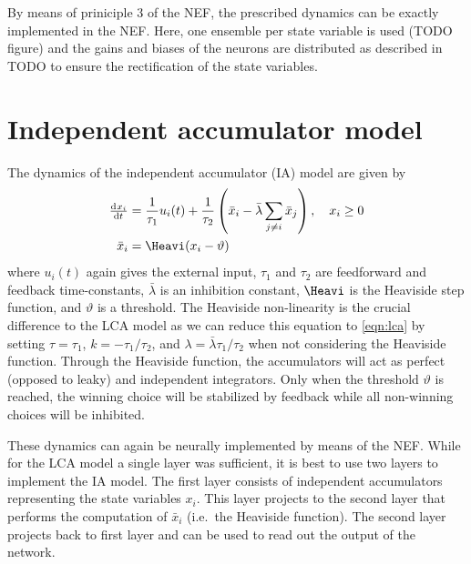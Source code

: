 By means of priniciple 3 of the NEF, the prescribed dynamics can be exactly implemented in the NEF\@.
Here, one ensemble per state variable is used (TODO figure) and the gains and biases of the neurons are distributed as described in TODO to ensure the rectification of the state variables.


\section{Independent accumulator model}
The dynamics of the independent accumulator (IA) model are given by
\begin{align}
    \od{x_i}{t} &= \frac{1}{\tau_1} u_i(t) + \frac{1}{\tau_2} \del{\bar{x}_i - \bar{\lambda} \sum_{j \neq i} \bar{x}_j}, \quad x_i \geq 0 \\
    \bar{x}_i &= \Heavi(x_i - \vartheta)
\end{align}
where $u_i(t)$ again gives the external input, $\tau_1$ and $\tau_2$ are feedforward and feedback time-constants, $\bar{\lambda}$ is an inhibition constant, $\Heavi$ is the Heaviside step function, and $\vartheta$ is a threshold.
The Heaviside non-linearity is the crucial difference to the LCA model as we can reduce this equation to \cref{eqn:lca} by setting $\tau = \tau_1$, $k = -\tau_1/\tau_2$, and $\lambda = \bar{\lambda} \tau_1/\tau_2$ when not considering the Heaviside function.
Through the Heaviside function, the accumulators will act as perfect (opposed to leaky) and independent integrators.
Only when the threshold $\vartheta$ is reached, the winning choice will be stabilized by feedback while all non-winning choices will be inhibited.

These dynamics can again be neurally implemented by means of the NEF\@.
While for the LCA model a single layer was sufficient, it is best to use two layers to implement the IA model.
The first layer consists of independent accumulators representing the state variables $x_i$.
This layer projects to the second layer that performs the computation of $\bar{x}_i$ (i.e.\ the Heaviside function).
The second layer projects back to first layer and can be used to read out the output of the network.

